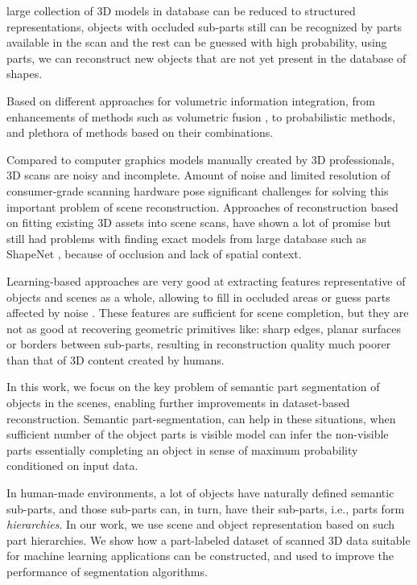 large collection of 3D models in database can be reduced to structured representations, 
objects with occluded sub-parts still can be recognized by parts available in the scan and the rest can be guessed with high probability, using parts, we can reconstruct new objects that are not yet present in the database of shapes.

Based on different approaches for volumetric information integration, from enhancements of  methods such as volumetric fusion \cite{curless1996volumetric}, to probabilistic  methods, and plethora of methods based on their combinations.

Compared to computer graphics models manually created by 3D professionals, 3D scans are noisy and incomplete.
Amount of noise and limited resolution of consumer-grade scanning hardware pose significant challenges for solving this important problem of scene reconstruction. 
Approaches of reconstruction based on fitting existing 3D assets into scene scans, have shown a lot of promise but still had problems with finding exact models from large database such as ShapeNet \cite{chang2015shapenet}, because of occlusion and lack of spatial context.

Learning-based approaches are very good at extracting features representative of objects and scenes as a whole, allowing to fill in occluded areas or guess parts affected by noise \cite{dai2017shape,dai2018scancomplete,song2017semantic}. These features are sufficient for scene completion, but they are not as good at recovering geometric primitives like: sharp edges, planar surfaces or borders between sub-parts, resulting in reconstruction quality much poorer than that of 3D content created by humans.

In this work, we focus on the key problem of semantic part segmentation of objects in the scenes, enabling further improvements in  dataset-based reconstruction. 
Semantic part-segmentation, can help in these situations, when sufficient number of the object parts is visible model can infer the non-visible parts essentially completing an object in sense of maximum probability conditioned on input data.

In human-made environments, a lot of objects have naturally defined semantic sub-parts, and those sub-parts can, in turn, have their sub-parts, i.e., parts form \emph{hierarchies}.  In our work, we use scene and object representation based on such part hierarchies.  We show how a part-labeled dataset of scanned 3D data suitable for machine learning applications can be constructed, and used to improve the performance of segmentation algorithms. 

